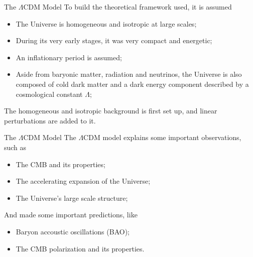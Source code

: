 \documentclass[serif, aspectratio=169]{beamer}
\begin{document}
\begin{frame}{The $\Lambda$CDM Model}
    To build the theoretical framework used, it is assumed

    \begin{itemize}
        \item The Universe is homogeneous and isotropic at large scales; %
        \item During its very early stages, it was very compact and energetic;
        \item An inflationary period is assumed;
        \item Aside from baryonic matter, radiation and neutrinos, the Universe is also composed of cold dark matter and a dark energy component described by a cosmological constant $\Lambda$;
    \end{itemize}

    The homogeneous and isotropic background is first set up, and linear perturbations are added to it.
\end{frame}

\begin{frame}{The $\Lambda$CDM Model}
	The $\Lambda$CDM model explains some important observations, such as
	
	\begin{itemize}
	\item The CMB and its properties;
	\item The accelerating expansion of the Universe;
	\item The Universe's large scale structure;
	\end{itemize}
	
	And made some important predictions, like
	
	\begin{itemize}
	\item Baryon accoustic oscillations (BAO);
	\item The CMB polarization and its properties.
	\end{itemize}
\end{frame}
\end{document}
